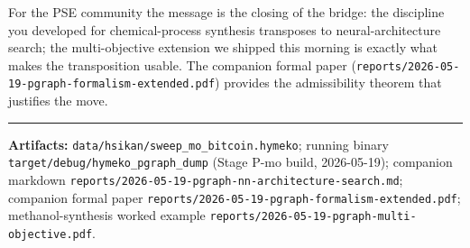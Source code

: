 \documentclass[11pt,a4paper]{article}
\newcommand{\code}[1]{\texttt{\small #1}}
\begin{document}
For the PSE community the message is the closing of the bridge: the
discipline you developed for chemical-process synthesis transposes to
neural-architecture search; the multi-objective extension we shipped
this morning is exactly what makes the transposition usable. The
companion formal paper
(\code{reports/2026-05-19-pgraph-formalism-extended.pdf}) provides
the admissibility theorem that justifies the move.

\vspace{8pt}\hrule\vspace{3pt}
\noindent\footnotesize
\textbf{Artifacts:} \code{data/hsikan/sweep\_mo\_bitcoin.hymeko};
running binary
\code{target/debug/hymeko\_pgraph\_dump} (Stage P-mo build,
2026-05-19); companion markdown
\code{reports/2026-05-19-pgraph-nn-architecture-search.md};
companion formal paper
\code{reports/2026-05-19-pgraph-formalism-extended.pdf};
methanol-synthesis worked example
\code{reports/2026-05-19-pgraph-multi-objective.pdf}.
\end{document}
